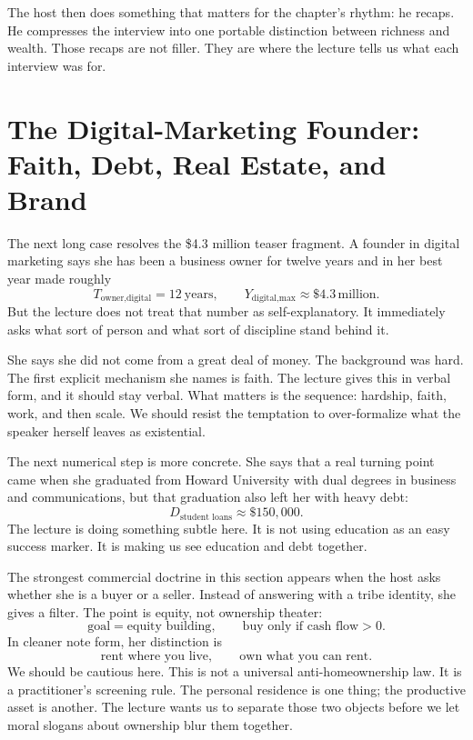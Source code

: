 The host then does something that matters for the chapter's rhythm: he recaps. He compresses the interview into one portable distinction between richness and wealth. Those recaps are not filler. They are where the lecture tells us what each interview was for.

\section{The Digital-Marketing Founder: Faith, Debt, Real Estate, and Brand}

The next long case resolves the \$4.3 million teaser fragment. A founder in digital marketing says she has been a business owner for twelve years and in her best year made roughly
\begin{equation}
T_{\text{owner,digital}} = 12\ \text{years},\qquad
Y_{\text{digital,max}} \approx \$4.3\,\text{million}.
\end{equation}
But the lecture does not treat that number as self-explanatory. It immediately asks what sort of person and what sort of discipline stand behind it.

She says she did not come from a great deal of money. The background was hard. The first explicit mechanism she names is faith. The lecture gives this in verbal form, and it should stay verbal. What matters is the sequence: hardship, faith, work, and then scale. We should resist the temptation to over-formalize what the speaker herself leaves as existential.

The next numerical step is more concrete. She says that a real turning point came when she graduated from Howard University with dual degrees in business and communications, but that graduation also left her with heavy debt:
\begin{equation}
D_{\text{student loans}} \approx \$150{,}000.
\end{equation}
The lecture is doing something subtle here. It is not using education as an easy success marker. It is making us see education and debt together.

The strongest commercial doctrine in this section appears when the host asks whether she is a buyer or a seller. Instead of answering with a tribe identity, she gives a filter. The point is equity, not ownership theater:
\begin{equation}
\text{goal} = \text{equity building},
\qquad
\text{buy only if } \text{cash flow} > 0.
\end{equation}
In cleaner note form, her distinction is
\begin{equation}
\text{rent where you live},\qquad
\text{own what you can rent}.
\end{equation}
We should be cautious here. This is not a universal anti-homeownership law. It is a practitioner's screening rule. The personal residence is one thing; the productive asset is another. The lecture wants us to separate those two objects before we let moral slogans about ownership blur them together.

